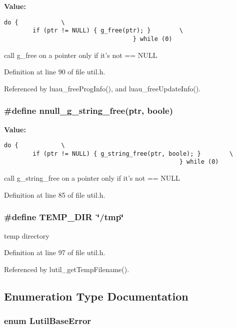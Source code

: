 {\bf Value:}

\footnotesize\begin{verbatim}do {            \
        if (ptr != NULL) { g_free(ptr); }        \
                                    } while (0)
\end{verbatim}\normalsize 
call g\_\-free on a pointer only if it's not == NULL 



Definition at line 90 of file util.h.

Referenced by luau\_\-free\-Prog\-Info(), and luau\_\-free\-Update\-Info().
\subsubsection{\setlength{\rightskip}{0pt plus 5cm}\#define nnull\_\-g\_\-string\_\-free(ptr, boole)}\label{util_8h_a3}


{\bf Value:}

\footnotesize\begin{verbatim}do {            \
        if (ptr != NULL) { g_string_free(ptr, boole); }        \
                                                 } while (0)
\end{verbatim}\normalsize 
call g\_\-string\_\-free on a pointer only if it's not == NULL 



Definition at line 85 of file util.h.
\subsubsection{\setlength{\rightskip}{0pt plus 5cm}\#define TEMP\_\-DIR\ \char`\"{}/tmp\char`\"{}}\label{util_8h_a5}


temp directory 



Definition at line 97 of file util.h.

Referenced by lutil\_\-get\-Temp\-Filename().

\subsection{Enumeration Type Documentation}
\subsubsection{\setlength{\rightskip}{0pt plus 5cm}enum {\bf Lutil\-Base\-Error}}\label{util_8h_a33}


